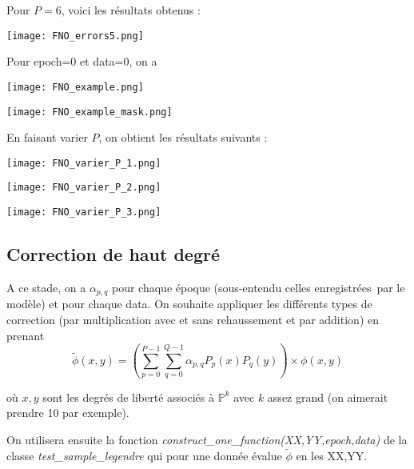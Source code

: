 Pour $P=6$, voici les résultats obtenus :

\begin{minipage}{\linewidth}
	\centering
	\texttt{[image: FNO\_errors5.png]}
\end{minipage}

Pour epoch=0 et data=0, on a 

\begin{minipage}{\linewidth}
	\centering
	\texttt{[image: FNO\_example.png]}
\end{minipage}

\begin{minipage}{\linewidth}
	\centering
	\texttt{[image: FNO\_example\_mask.png]}
\end{minipage}

En faisant varier $P$, on obtient les résultats suivants :

\begin{minipage}{\linewidth}
	\centering
	\texttt{[image: FNO\_varier\_P\_1.png]}
\end{minipage}

\begin{minipage}{\linewidth}
	\centering
	\texttt{[image: FNO\_varier\_P\_2.png]}
\end{minipage}

\begin{minipage}{\linewidth}
	\centering
	\texttt{[image: FNO\_varier\_P\_3.png]}
\end{minipage}

\subsection{Correction de haut degré}

A ce stade, on a $\alpha_{p,q}$ pour chaque époque (sous-entendu celles enregistrées par le modèle) et pour chaque data. On souhaite appliquer les différents types de correction (par multiplication avec et sans rehaussement et par addition) en prenant 
$$\tilde{\phi}(x,y)=\left(\sum_{p=0}^{P-1}\sum_{q=0}^{Q-1}\alpha_{p,q} P_p(x)P_q(y)\right)\times \phi(x,y)$$

où $x,y$ sont les degrés de liberté associés à $\mathbb{P}^k$ avec $k$ assez grand (on aimerait prendre 10 par exemple).

On utilisera ensuite la fonction \textit{construct\_one\_function(XX,YY,epoch,data)} de la classe \textit{test\_sample\_legendre} qui pour une donnée évalue $\tilde{\phi}$ en les XX,YY. 

